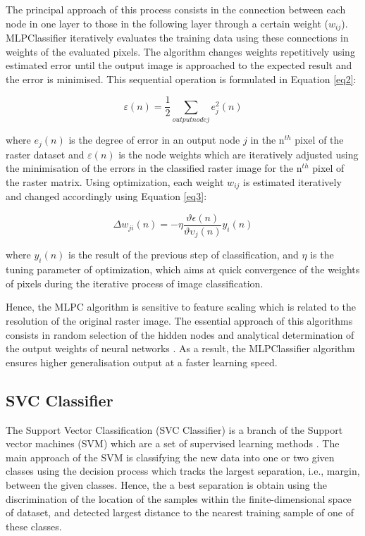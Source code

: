 \documentclass[final,5p,times,twocolumn]{elsarticle}
\begin{document}
The principal approach of this process consists in the connection between each node in one layer to those in the following layer through a certain weight ($w_{ij}$). MLPClassifier iteratively evaluates the training data using these connections in weights of the evaluated pixels. The algorithm changes weights repetitively using estimated error until the output image is approached to the expected result and the error is minimised. This sequential operation is formulated in Equation \ref{eq2}: 

\begin{equation}
\varepsilon(n)=\frac{1}{2} \sum_{output node j}{e_{j}^2(n)}
\label{eq2}
\end{equation}

where $e_j(n)$ is the degree of error in an output node $j$ in the n$^{th}$  pixel of the raster dataset and $\varepsilon(n)$ is the node weights which are iteratively adjusted using the minimisation of the errors in the classified raster image for the n$^{th}$ pixel of the raster matrix. Using optimization, each weight $w_{ij}$ is estimated iteratively and changed accordingly using Equation \ref{eq3}: 

\begin{equation}
\Delta w_{ji}(n)=-\eta\frac{\vartheta\epsilon(n)}{\vartheta\upsilon_{j}(n)}y_{i}(n)
\label{eq3}
\end{equation}

where $y_{i}(n)$ is the result of the previous step of classification, and $\eta$ is the tuning parameter of optimization, which aims at quick convergence of the weights of pixels during the iterative process of image classification.

Hence, the MLPC algorithm is sensitive to feature scaling which is related to the resolution of the original raster image. The essential approach of this algorithms consists in random selection of the hidden nodes and analytical determination of the output weights of neural networks \cite{HUANG2006489}. As a result, the MLPClassifier algorithm ensures higher generalisation output at a faster learning speed. 

\subsection{SVC Classifier}

The Support Vector Classification (SVC Classifier) is a branch of the Support vector machines (SVM) which are a set of supervised learning methods \cite{Cortes}. The main approach of the SVM is classifying the new data into one or two given classes using the decision process which tracks the largest separation, i.e., margin, between the given classes. Hence, the a best separation is obtain using the discrimination of the location of the samples within the finite-dimensional space of dataset, and detected largest distance to the nearest training sample of one of these classes. 
\end{document}
